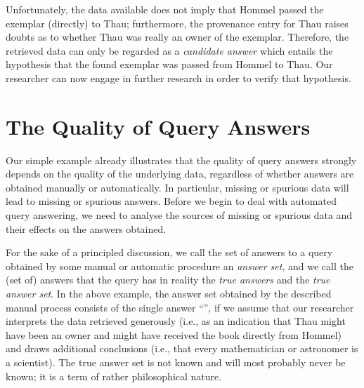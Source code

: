 Unfortunately, the data available does not imply that Hommel passed the exemplar (directly) to Thau;
furthermore, the provenance entry for Thau raises doubts as to whether Thau was really an owner of the exemplar.
Therefore, the retrieved data can only be regarded as a \emph{candidate answer}
which entails the hypothesis that the found exemplar was passed from Hommel to Thau.
Our researcher can now engage in further research in order to verify that hypothesis.


\section{The Quality of Query Answers}
\label{sec:quality_of_answers}

Our simple example already illustrates that the quality of query answers
strongly depends on the quality of the underlying data,
regardless of whether answers are obtained manually or automatically. 
In particular, missing or spurious data will lead to missing or spurious answers.
Before we begin to deal with automated query answering,
we need to analyse the sources of missing or spurious data and their effects on the answers obtained.

For the sake of a principled discussion, we call the set of answers to a query obtained by some manual or automatic procedure
an \emph{answer set}, and we call the (set of) answers that the query has in reality the \emph{true answers} and the \emph{true answer set}.
In the above example, the answer set obtained by the described manual process consists of the single answer
\enquote{}, if we assume that our researcher interprets the data retrieved generously
(i.e., as an indication that Thau might have been an owner and might have received the book directly from Hommel)
and draws additional conclusions (i.e., that every mathematician or astronomer is a scientist).
The true answer set is not known and will most probably never be known; it is a term of rather philosophical nature.

